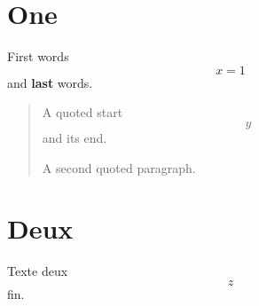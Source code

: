 \documentclass{article}
\begin{document}
\section{One}
First words \[ x = 1 \] and \textbf{last} words.
\begin{quote}
A quoted start
\[ y \]
and its end.

A second quoted paragraph.
\end{quote}
\section{Deux}
Texte deux \[ z \] fin.
\end{document}
